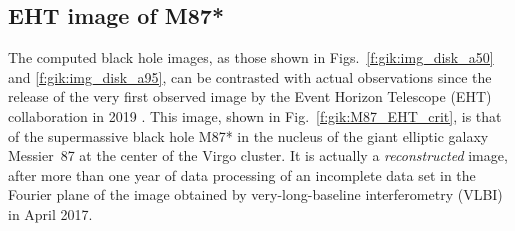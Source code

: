 \subsection{EHT image of M87*} \label{s:gik:M87_image}

The computed black hole images, as those shown in Figs.~\ref{f:gik:img_disk_a50}
and \ref{f:gik:img_disk_a95}, can be contrasted with actual observations since
the release of the very first observed image by the
Event Horizon Telescope (EHT) collaboration in 2019 \cite{EHT19a,Wielg_al20}. This image, shown in Fig.~\ref{f:gik:M87_EHT_crit}, is that
of the supermassive black hole M87* in the nucleus of
the giant elliptic galaxy Messier~87 at the center of the Virgo cluster. It is actually
a \emph{reconstructed} image, after more than one year of data processing
of an incomplete data set in the Fourier plane of the image obtained
by very-long-baseline interferometry (VLBI) in April 2017.

